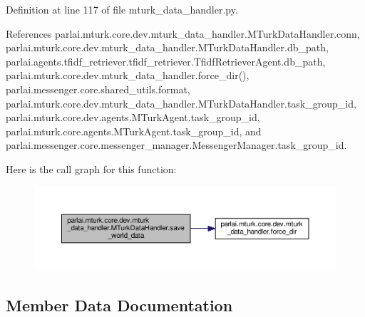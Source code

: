 Definition at line 117 of file mturk\+\_\+data\+\_\+handler.\+py.



References parlai.\+mturk.\+core.\+dev.\+mturk\+\_\+data\+\_\+handler.\+M\+Turk\+Data\+Handler.\+conn, parlai.\+mturk.\+core.\+dev.\+mturk\+\_\+data\+\_\+handler.\+M\+Turk\+Data\+Handler.\+db\+\_\+path, parlai.\+agents.\+tfidf\+\_\+retriever.\+tfidf\+\_\+retriever.\+Tfidf\+Retriever\+Agent.\+db\+\_\+path, parlai.\+mturk.\+core.\+dev.\+mturk\+\_\+data\+\_\+handler.\+force\+\_\+dir(), parlai.\+messenger.\+core.\+shared\+\_\+utils.\+format, parlai.\+mturk.\+core.\+dev.\+mturk\+\_\+data\+\_\+handler.\+M\+Turk\+Data\+Handler.\+task\+\_\+group\+\_\+id, parlai.\+mturk.\+core.\+dev.\+agents.\+M\+Turk\+Agent.\+task\+\_\+group\+\_\+id, parlai.\+mturk.\+core.\+agents.\+M\+Turk\+Agent.\+task\+\_\+group\+\_\+id, and parlai.\+messenger.\+core.\+messenger\+\_\+manager.\+Messenger\+Manager.\+task\+\_\+group\+\_\+id.

Here is the call graph for this function\+:
\nopagebreak
\begin{figure}[H]
\begin{center}
\leavevmode
\includegraphics[width=350pt]{classparlai_1_1mturk_1_1core_1_1dev_1_1mturk__data__handler_1_1MTurkDataHandler_a6d5a47cdeede36a2fb650f28dd72ef12_cgraph}
\end{center}
\end{figure}


\subsection{Member Data Documentation}
\mbox{\label{classparlai_1_1mturk_1_1core_1_1dev_1_1mturk__data__handler_1_1MTurkDataHandler_a66361d334cabae5782ca8a8740b32e95}} 
